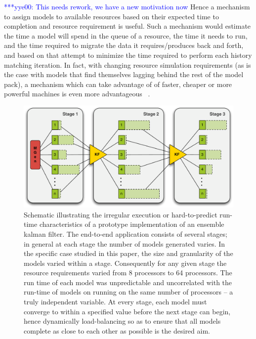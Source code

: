 \documentclass[conference,final]{IEEEtran}
\newcommand{\yyenote}[1]{ {\textcolor{blue} { ***yye00: #1 }}}
\begin{document}
\yyenote{This needs rework, we have a new motivation now}
Hence a mechanism to assign models to available resources based on
their expected time to completion and resource requirement is useful.
Such a mechanism would estimate the time a model will spend in the
queue of a resource, the time it needs to run, and the time required
to migrate the data it requires/produces back and forth, and based on
that attempt to minimize the time required to perform each history
matching iteration.  In fact, with changing resource simulation
requirements (as is the case with models that find themselves lagging
behind the rest of the model pack), a mechanism which can take
advantage of of faster, cheaper or more powerful machines is even more
advantageous ~\cite{escience07}.

\begin{figure}
\begin{center}
\includegraphics*[scale=0.36,]{./figures/3StageKalmanFilter}
\end{center}
\caption{Schematic illustrating the irregular execution or
  hard-to-predict run-time characteristics of a prototype
  implementation of an ensemble kalman filter. The end-to-end
  application consists of several stages; in general at each stage the
  number of models generated varies. In the specific case studied in
  this paper, the size and granularity of the models varied within a
  stage. Consequently for any given stage the resource requirements
  varied from 8 processors to 64 processors.  The run time of each
  model was unpredictable and uncorrelated with the run-time of models
  on running on the same number of processors -- a truly independent
  variable. At every stage, each model must converge to within a
  specified value before the next stage can begin, hence dynamically
  load-balancing so as to ensure that all models complete as close to
  each other as possible is the desired aim.}
\label{fig:irregular_execution}
\end{figure}
\end{document}

